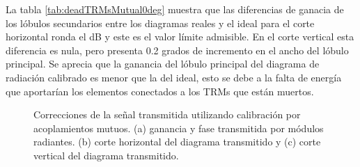La tabla \ref{tab:deadTRMsMutual0deg} muestra que las diferencias de ganacia de los lóbulos secundarios entre los diagramas 
reales y el ideal para el corte horizontal ronda el dB y este es el valor límite admisible. En el corte vertical esta 
diferencia es nula, pero presenta 0.2 grados de incremento en el ancho del lóbulo principal. Se aprecia que la ganancia del 
lóbulo principal del diagrama de radiación calibrado es menor que la del ideal, esto se debe a la falta de energía que 
aportarían los elementos conectados a los TRMs que están muertos.

\begin{figure}[H]
	\centering

	\caption{Correcciones de la señal transmitida utilizando calibración por acoplamientos mutuos. (a) ganancia y fase transmitida por módulos
		radiantes. (b) corte horizontal del diagrama transmitido y (c) corte vertical del diagrama transmitido.}
	\label{fig:deadTRMsMutual0deg}
\end{figure}
